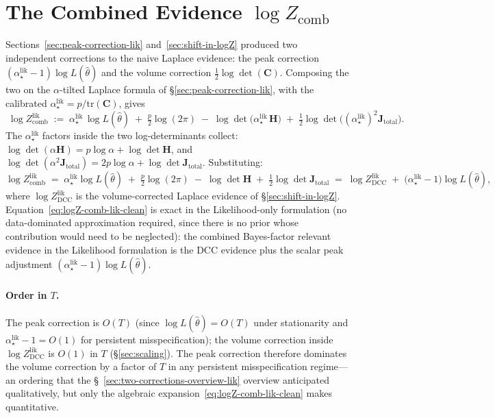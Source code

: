 \documentclass[11pt]{article}
\begin{document}
\section{The Combined Evidence $\log Z_{\mathrm{comb}}$}
\label{sec:combined-evidence-lik}

Sections~\ref{sec:peak-correction-lik} and~\ref{sec:shift-in-logZ} produced
two independent corrections to the naive Laplace evidence: the peak
correction $(\alpha_\star^{\mathrm{lik}}-1)\log L(\hat\theta)$ and the volume
correction $\tfrac{1}{2}\log\det(\mathbf C)$. Composing the two on the
$\alpha$-tilted Laplace formula of
\S\ref{sec:peak-correction-lik}, with the calibrated
$\alpha_\star^{\mathrm{lik}} = p/\mathrm{tr}(\mathbf C)$, gives
\begin{equation}
\boxed{\;
\log Z_{\mathrm{comb}}^{\mathrm{lik}}
\;:=\;
\alpha_\star^{\mathrm{lik}}\,\log L(\hat\theta)
\;+\;
\tfrac{p}{2}\log(2\pi)
\;-\;
\log\det\!\bigl(\alpha_\star^{\mathrm{lik}}\,\mathbf H\bigr)
\;+\;
\tfrac{1}{2}\log\det\!\bigl((\alpha_\star^{\mathrm{lik}})^2\mathbf J_{\mathrm{total}}\bigr).
\;}
\label{eq:logZ-comb-lik-def}
\end{equation}
The $\alpha_\star^{\mathrm{lik}}$ factors inside the two log-determinants
collect: $\log\det(\alpha\mathbf H) = p\log\alpha + \log\det\mathbf H$, and
$\log\det(\alpha^2\mathbf J_{\mathrm{total}}) = 2p\log\alpha
+ \log\det\mathbf J_{\mathrm{total}}$. Substituting:
\begin{equation}
\log Z_{\mathrm{comb}}^{\mathrm{lik}}
\;=\;
\alpha_\star^{\mathrm{lik}}\log L(\hat\theta)
\;+\;
\tfrac{p}{2}\log(2\pi)
\;-\;
\log\det\mathbf H
\;+\;
\tfrac{1}{2}\log\det\mathbf J_{\mathrm{total}}
\;=\;
\log Z_{\mathrm{DCC}}^{\mathrm{lik}}
\;+\;
\bigl(\alpha_\star^{\mathrm{lik}}-1\bigr)\log L(\hat\theta),
\label{eq:logZ-comb-lik-clean}
\end{equation}
where $\log Z_{\mathrm{DCC}}^{\mathrm{lik}}$ is the volume-corrected Laplace
evidence of \S\ref{sec:shift-in-logZ}. Equation~\eqref{eq:logZ-comb-lik-clean}
is exact in the Likelihood-only formulation (no data-dominated approximation
required, since there is no prior whose contribution would need to be
neglected): the combined Bayes-factor relevant evidence in the Likelihood
formulation is the DCC evidence plus the scalar peak adjustment
$(\alpha_\star^{\mathrm{lik}}-1)\log L(\hat\theta)$.

\paragraph{Order in $T$.}
The peak correction is $O(T)$ (since $\log L(\hat\theta) = O(T)$ under
stationarity and $\alpha_\star^{\mathrm{lik}}-1 = O(1)$ for persistent
misspecification); the volume correction inside $\log Z_{\mathrm{DCC}}^{\mathrm{lik}}$
is $O(1)$ in $T$ (\S\ref{sec:scaling}). The peak correction therefore
dominates the volume correction by a factor of $T$ in any persistent
misspecification regime---an ordering that the \S~\ref{sec:two-corrections-overview-lik}
overview anticipated qualitatively, but only the algebraic
expansion~\eqref{eq:logZ-comb-lik-clean} makes quantitative.
\end{document}
